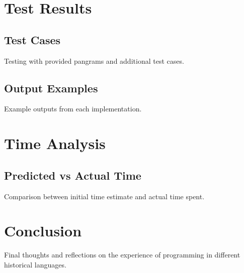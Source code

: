 \documentclass[12pt]{article}
\begin{document}
\section{Test Results}
\subsection{Test Cases}
Testing with provided pangrams and additional test cases.

\subsection{Output Examples}
Example outputs from each implementation.

\section{Time Analysis}
\subsection{Predicted vs Actual Time}
Comparison between initial time estimate and actual time spent.

\section{Conclusion}
Final thoughts and reflections on the experience of programming in different historical languages.
\end{document}

